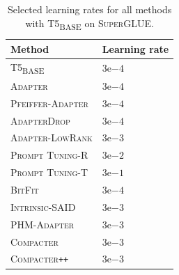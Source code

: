 \documentclass{article}
\newcommand{\basebase}{T5\textsubscript{\tiny BASE}\xspace}
\newcommand{\adapter}{\textsc{Adapter}\xspace}
\newcommand{\adapterlowrank}{\textsc{Adapter-LowRank}\xspace}
\newcommand{\compacter}{\textsc{Compacter}\xspace}
\newcommand{\compacteronlyff}{\textsc{Compacter}\texttt{++}\xspace} %
\newcommand{\phmadapter}{\textsc{PHM-Adapter}\xspace}
\newcommand{\intrinsic}{\textsc{Intrinsic-SAID}\xspace}
\newcommand{\prompttuningrandom}{\textsc{Prompt Tuning-R}\xspace}
\newcommand{\prompttuningtokens}{\textsc{Prompt Tuning-T}\xspace}
\newcommand{\pfeifferadapter}{\textsc{Pfeiffer-Adapter}\xspace}
\newcommand{\superglue}{\textsc{SuperGLUE}\xspace}
\newcommand{\adapterdrop}{\textsc{AdapterDrop}\xspace}
\newcommand{\bitfit}{\textsc{BitFit}\xspace}
\begin{document}
\begin{table}[H]
\begin{minipage}{.5\linewidth}
    \end{minipage}\quad
    \begin{minipage}{.5\linewidth}
          \centering
       \caption{Selected learning rates for all methods with \basebase on \superglue.}
       \begin{tabular}{ll}
    \toprule
    \textbf{Method} & \textbf{Learning rate}   \\
    \midrule  
    \basebase &  $3\mathrm{e}{-4}$\\ 
    \adapter & $3\mathrm{e}{-4}$ \\
    \pfeifferadapter & $3\mathrm{e}{-4}$ \\ 
    \adapterdrop & $3\mathrm{e}{-4}$ \\ 
    \adapterlowrank & $3\mathrm{e}{-3}$ \\ 
    \prompttuningrandom &$3\mathrm{e}{-2}$ \\ 
    \prompttuningtokens & $3\mathrm{e}{-1}$\\
    \bitfit & $3\mathrm{e}{-4}$\\ 
    \intrinsic &  $3\mathrm{e}{-3}$\\
    \phmadapter & $3\mathrm{e}{-3}$  \\ 
    \compacter &  $3\mathrm{e}{-3}$ \\ 
    \compacteronlyff &  $3\mathrm{e}{-3}$ \\ 
    \bottomrule
    \end{tabular}
     \label{tab:lrs_superglue}
    
    \end{minipage} 
\end{table}
\end{document}

